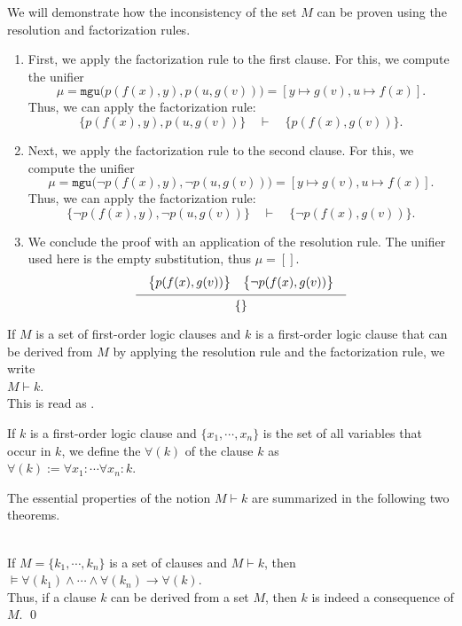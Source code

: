 \noindent
We will demonstrate how the inconsistency of the set $M$ can be proven using the resolution and factorization rules.
\begin{enumerate}
\item First, we apply the factorization rule to the first clause. 
      For this, we compute the unifier 
      \[ \mu = \mathtt{mgu}\bigl(p(f(x),y), p(u,g(v))\bigr) = [y \mapsto g(v), u \mapsto f(x)]. \]
      Thus, we can apply the factorization rule: 
      \[ \bigl\{p(f(x),y), p(u,g(v))\bigr\} \quad \vdash \quad \bigl\{p(f(x),g(v))\bigr\}. \]
\item Next, we apply the factorization rule to the second clause.
      For this, we compute the unifier 
      \[ \mu = \mathtt{mgu}\bigl(\neg p(f(x),y), \neg p(u,g(v))\bigr) = [y \mapsto g(v), u \mapsto f(x)]. 
      \]
      Thus, we can apply the factorization rule: 
      \[ \bigl\{ \neg p(f(x),y), \neg p(u,g(v))\bigr\} \quad \vdash \quad \bigl\{\neg p(f(x),g(v))\bigr\}.
      \]
\item We conclude the proof with an application of the resolution rule.
      The unifier used here is the empty substitution, thus $\mu = []$.      
      \[ \schluss{\bigl\{p(f(x),g(v))\bigr\} \quad \bigl\{\neg p(f(x),g(v))\bigr\}}{\{\}} \]
\end{enumerate}

If $M$ is a set of first-order logic clauses and $k$ is a first-order logic
clause that can be derived from $M$ by applying the resolution rule and the factorization rule, we write \\[0.2cm]
\hspace*{1.3cm} $M \vdash k$. 
\\[0.2cm]
This is read as  .

\begin{Definition} 
  If $k$ is a first-order logic clause and $\{x_1,\cdots,x_n\}$
  is the set of all variables that occur in $k$, we define
  the  $\forall(k)$ of the clause $k$ as \\[0.2cm]
  \hspace*{1.3cm} $\forall(k) := \forall x_1\colon \cdots \forall x_n \colon k$. \eox
\end{Definition}

The essential properties of the notion $M \vdash k$ are summarized in the following two theorems.

\begin{Satz}  \hspace*{\fill} \\
    If $M = \{k_1,\cdots,k_n\}$ is a set of clauses and $M \vdash k$, then \\[0.2cm]
    \hspace*{1.3cm} $\models \forall(k_1) \wedge \cdots \wedge \forall(k_n) \rightarrow \forall(k)$. \\[0.2cm]
    Thus, if a clause $k$ can be derived from a set $M$, 
    then $k$ is indeed a consequence of $M$. \qed
\end{Satz}

